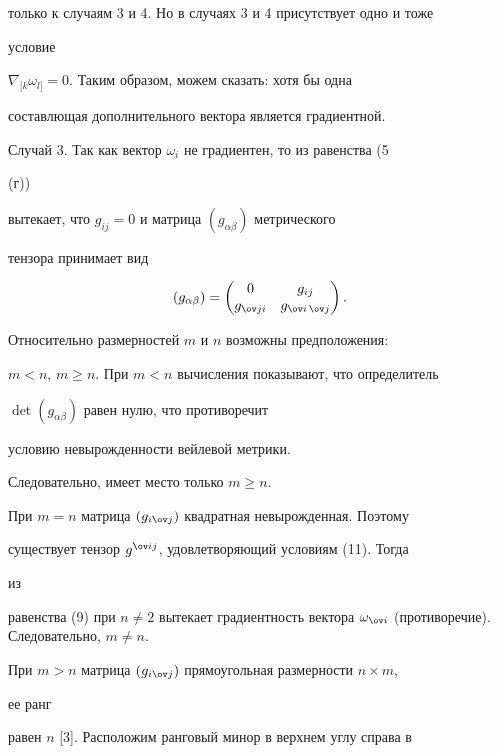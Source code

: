 только к случаям 3 и 4. Но в случаях 3 и 4 присутствует одно и тоже 


условие 


$\nabla_{[k}\omega_{l]}=0$. Таким образом, можем сказать: хотя бы одна


составлющая дополнительного вектора является градиентной. 


 


Случай 3. Так как вектор $\omega_i$ не градиентен, то из равенства (5 


(г)) 


вытекает, что $g_{i j}=0$ и матрица $(g_{\alpha\beta})$ метрического 


тензора принимает вид 


\begin{equation} 


(g_{\alpha\beta})= 


\begin{pmatrix} 


0 & g_{i j} \\ g_{\ov j i} & g_{\ov i\,\ov j} 


\end{pmatrix} 


. 


\end{equation} 


Относительно размерностей $m$ и $n$ возможны предположения: 


$m<n$, $m\ge n$. При $m<n$ вычисления показывают, что определитель 


$\det(g_{\alpha\beta})$ равен нулю, что противоречит


условию невырожденности вейлевой метрики. 


Следовательно, имеет место только $m\ge n$. 


При $m=n$ матрица $(g_{i\ov j})$ квадратная невырожденная. Поэтому 


существует тензор $g^{\ov i j}$, удовлетворяющий условиям (11). Тогда 


из 


равенства (9) при $n\ne2$ вытекает градиентность вектора $\omega_{\ov 


i}$ (противоречие). Следовательно, $m\ne n$. 


При $m>n$ матрица $(g_{i\ov j})$ прямоугольная размерности $n\times m$, 


ее ранг 


равен $n$ [3]. Расположим ранговый минор в верхнем углу справа в 


